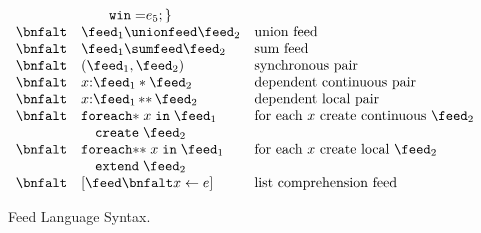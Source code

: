\begin{figure}[t]
\[\begin{array}{lll}
& \qquad     \mathtt{win=} e_5; \}  & \\
 \bnfalt & \feed_1 \unionfeed \feed_2 & \mbox{union feed} \\
 \bnfalt & \feed_1 \sumfeed \feed_2 & \mbox{sum feed} \\
 \bnfalt & (\feed_1, \feed_2) & \mbox{synchronous pair} \\
 \bnfalt & x{:}\feed_1 * \feed_2 & \mbox{dependent continuous pair} \\
 \bnfalt & x{:}\feed_1\, {*}{*} \, \feed_2 & \mbox{dependent local pair} \\
 \bnfalt &     \mathtt{foreach{*}}\; x \; 
    \mathtt{in}\; \feed_1 & \mbox{for each $x$ create continuous $\feed_2$} \\
 &   \quad \mathtt{create}\; \feed_2 \\
 \bnfalt &     \mathtt{foreach{*}{*}}\; x \; 
    \mathtt{in}\; \feed_1 & \mbox{for each $x$ create local $\feed_2$}\\
 &   \quad \mathtt{extend}\; \feed_2 \\
 \bnfalt & [\feed \bnfalt x \leftarrow e ] & \mbox{list comprehension feed} \\
\end{array}
\]
\caption{Feed Language Syntax.}
\label{fig:syntax}
\end{figure}


